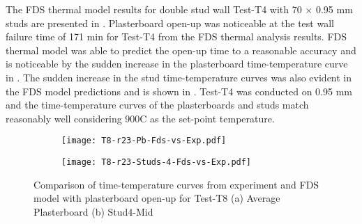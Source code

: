 The FDS thermal model results for double stud wall Test-T4 with 70 $\times$ 0.95 mm studs are presented in . Plasterboard open-up was noticeable at the test wall failure time of 171 min for Test-T4 from the FDS thermal analysis results. FDS thermal model was able to predict the open-up time to a reasonable accuracy and is noticeable by the sudden increase in the plasterboard time-temperature curve in . The sudden increase in the stud time-temperature curves was also evident in the FDS model predictions and is shown in . Test-T4 was conducted on 0.95 mm and the time-temperature curves of the plasterboards and studs match reasonably well considering 900\degree C as the set-point temperature.
\begin{figure}[!htbp]
	\centering
	\begin{subfigure}[b]{0.7\textwidth}
		\centering
		\texttt{[image: T8-r23-Pb-Fds-vs-Exp.pdf]}
		\caption{}
		\label{subfig:T8-r23-Pb-Fds-vs-Exp-pbop}
	\end{subfigure}
	\begin{subfigure}[b]{0.6\textwidth}
		\centering
		\texttt{[image: T8-r23-Studs-4-Fds-vs-Exp.pdf]}
		\caption{}
		\label{subfig:T8-r23-Studs-4-Fds-vs-Exp-pbop}
	\end{subfigure}
	   \caption{Comparison of time-temperature curves from experiment and FDS model with plasterboard open-up for Test-T8 (a) Average Plasterboard (b) Stud4-Mid}
	   \label{fig:T8-fds-output-pbop}
\end{figure}

